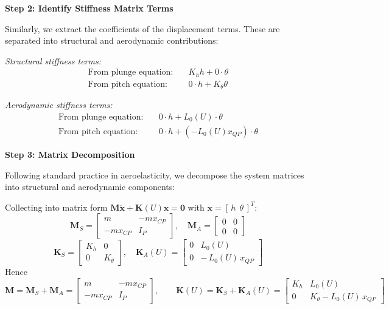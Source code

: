 \documentclass{article}
\begin{document}
\textbf{Step 2: Identify Stiffness Matrix Terms}

Similarly, we extract the coefficients of the displacement terms. These are separated into structural and aerodynamic contributions:

\textit{Structural stiffness terms:}
\begin{align}
\text{From plunge equation:} \quad &K_h h + 0 \cdot \theta \\
\text{From pitch equation:} \quad &0 \cdot h + K_\theta \theta
\end{align}

\textit{Aerodynamic stiffness terms:}
\begin{align}
\text{From plunge equation:} \quad &0 \cdot h + L_0(U) \cdot \theta \\
\text{From pitch equation:} \quad &0 \cdot h + (-L_0(U) x_{QP}) \cdot \theta
\end{align}

\textbf{Step 3: Matrix Decomposition}

Following standard practice in aeroelasticity, we decompose the system matrices into structural and aerodynamic components:

\noindent Collecting into matrix form \(\mathbf{M}\ddot{\bm{x}}+\mathbf{K}(U)\bm{x}=\bm{0}\) with \(\bm{x}=[\,h\ \ \theta\,]^T\):
\begin{equation}
\mathbf{M}_S=
\begin{bmatrix}
m & -m x_{CP}\\[2pt]
- m x_{CP} & I_P
\end{bmatrix},\quad
\mathbf{M}_A=
\begin{bmatrix}
0&0\\[2pt]0&0
\end{bmatrix}
\label{eq:mass_matrices}
\end{equation}
\begin{equation}
\mathbf{K}_S=
\begin{bmatrix}
K_h & 0\\[2pt]
0 & K_\theta
\end{bmatrix},\quad
\mathbf{K}_A(U)=
\begin{bmatrix}
0 & L_0(U)\\[2pt]
0 & -\,L_0(U)\,x_{QP}
\end{bmatrix}
\label{eq:stiffness_matrices}
\end{equation}
\noindent Hence
\begin{equation}
\mathbf{M}=\mathbf{M}_S+\mathbf{M}_A=
\begin{bmatrix}
m & -m x_{CP}\\
- m x_{CP} & I_P
\end{bmatrix},\qquad
\mathbf{K}(U)=\mathbf{K}_S+\mathbf{K}_A(U)=
\begin{bmatrix}
K_h & L_0(U)\\
0 & K_\theta - L_0(U)\,x_{QP}
\end{bmatrix}
\label{eq:combined_matrices}
\end{equation}
\end{document}
